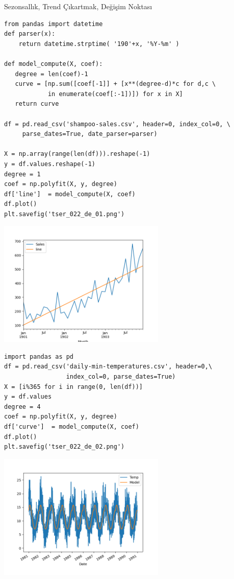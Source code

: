 \documentclass[12pt,fleqn]{article}\usepackage{../../common}
\begin{document}
Sezonsallık, Trend Çıkartmak, Değişim Noktası



\begin{verbatim}
from pandas import datetime
def parser(x):
    return datetime.strptime( '190'+x, '%Y-%m' )

def model_compute(X, coef):
   degree = len(coef)-1
   curve = [np.sum([coef[-1]] + [x**(degree-d)*c for d,c \
            in enumerate(coef[:-1])]) for x in X]
   return curve
    
df = pd.read_csv('shampoo-sales.csv', header=0, index_col=0, \
     parse_dates=True, date_parser=parser)

X = np.array(range(len(df))).reshape(-1)
y = df.values.reshape(-1)
degree = 1
coef = np.polyfit(X, y, degree)
df['line']  = model_compute(X, coef)
df.plot()
plt.savefig('tser_022_de_01.png')
\end{verbatim}


\includegraphics[height=6cm]{tser_022_de_01.png}








\begin{verbatim}
import pandas as pd
df = pd.read_csv('daily-min-temperatures.csv', header=0,\
                 index_col=0, parse_dates=True)
X = [i%365 for i in range(0, len(df))]
y = df.values
degree = 4
coef = np.polyfit(X, y, degree)
df['curve']  = model_compute(X, coef)
df.plot()
plt.savefig('tser_022_de_02.png')
\end{verbatim}






\includegraphics[height=6cm]{tser_022_de_02.png}




 
\end{document}
